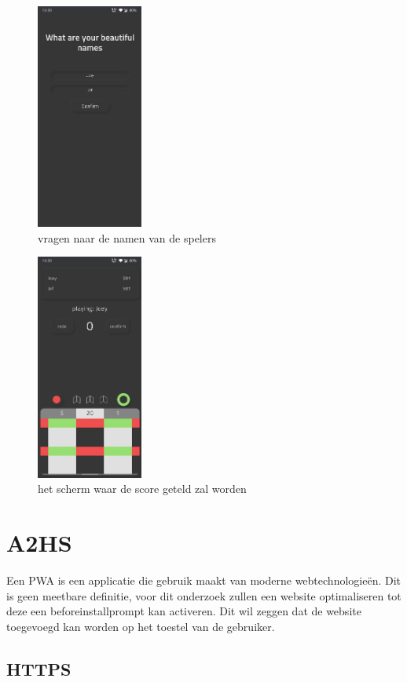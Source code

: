 	\begin{figure}[H]
		\centering
		\includegraphics[width=35mm]{./img/dart2.png}{}
		\caption{vragen naar de namen van de spelers}
	\end{figure}
	
	\begin{figure}[H]
		\centering
		\includegraphics[width=35mm]{./img/dart3.png}{}
		\caption{het scherm waar de score geteld zal worden}
	\end{figure}
	


\section{A2HS}

	Een PWA is een applicatie die gebruik maakt van moderne webtechnologieën. Dit is geen meetbare definitie, voor dit onderzoek zullen een website optimaliseren tot deze een beforeinstallprompt kan activeren. Dit wil zeggen dat de website toegevoegd kan worden op het toestel van de gebruiker.

	\subsection{HTTPS}

